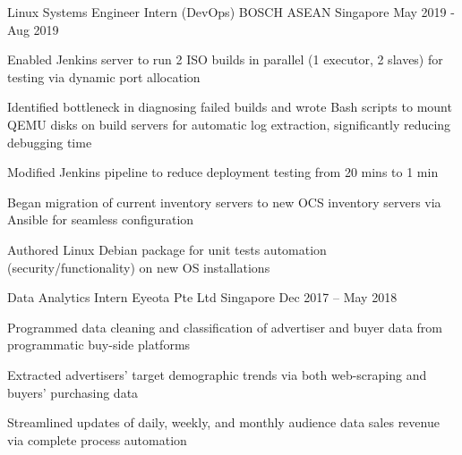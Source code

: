 \begin{cventries}
  \cventry
    {Linux Systems Engineer Intern (DevOps)} %
    {BOSCH ASEAN} %
    {Singapore} %
    {May 2019 - Aug 2019} %
    {
      \begin{cvitems} %
        \item {Enabled Jenkins server to run 2 ISO builds in parallel (1 executor, 2 slaves) for testing via dynamic port allocation}
        \item {Identified bottleneck in diagnosing failed builds and wrote Bash scripts to mount QEMU disks on build servers for automatic log extraction, significantly reducing debugging time}
        \item {Modified Jenkins pipeline to reduce deployment testing from 20 mins to 1 min}
        \item {Began migration of current inventory servers to new OCS inventory servers via Ansible for seamless configuration}
        \item {Authored Linux Debian package for unit tests automation (security/functionality) on new OS installations}
      \end{cvitems}
    }

  \cventry
    {Data Analytics Intern} %
    {Eyeota Pte Ltd } %
    {Singapore} %
    {Dec 2017 – May 2018} %
    {
      \begin{cvitems} %
        \item {Programmed data cleaning and classification of advertiser and buyer data from programmatic buy-side platforms}
        \item {Extracted advertisers’ target demographic trends via both web-scraping and buyers’ purchasing data}
        \item {Streamlined updates of daily, weekly, and monthly audience data sales revenue via complete process automation}
      \end{cvitems}
    }



\end{cventries}
